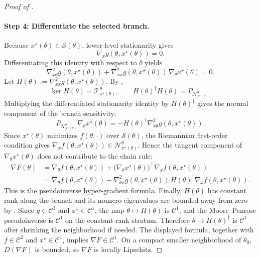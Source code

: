 \documentclass{article}
\theoremstyle{normaltheorem}
\newcommand{\calS}{\mathcal{S}}
\newcommand{\calT}{\mathcal{T}}
\newcommand{\calN}{\mathcal{N}}
\begin{document}
\begin{proof}[Proof of ]
\paragraph{Step 4: Differentiate the selected branch.}
Because \(x^\star(\theta)\in\calS(\theta)\), lower-level stationarity gives
\[
\nabla_x g(\theta,x^\star(\theta))=0.
\]
Differentiating this identity with respect to \(\theta\) yields
\[
\nabla_{x\theta}^{2}g(\theta,x^\star(\theta))
+\nabla_{xx}^{2}g(\theta,x^\star(\theta))\,\nabla_\theta x^\star(\theta)=0.
\]
Let \(H(\theta):=\nabla_{xx}^{2}g(\theta,x^\star(\theta))\). By ,
\[
\ker H(\theta)=\calT_{x^\star(\theta)}^\theta,
\qquad
H(\theta)^\dagger H(\theta)=P_{\calN_{x^\star(\theta)}^\theta}.
\]
Multiplying the differentiated stationarity identity by \(H(\theta)^\dagger\) gives the normal component of the branch
sensitivity:
\[
P_{\calN_{x^\star(\theta)}^\theta}\nabla_\theta x^\star(\theta)
=
-H(\theta)^\dagger\nabla_{x\theta}^{2}g(\theta,x^\star(\theta)).
\]
Since \(x^\star(\theta)\) minimizes \(f(\theta,\cdot)\) over \(\calS(\theta)\), the Riemannian first-order condition gives
\(\nabla_x f(\theta,x^\star(\theta))\in\calN_{x^\star(\theta)}^\theta\). Hence the tangent component of
\(\nabla_\theta x^\star(\theta)\) does not contribute to the chain rule:
\[
\begin{aligned}
\nabla F(\theta)
&=\nabla_\theta f(\theta,x^\star(\theta))
+\big(\nabla_\theta x^\star(\theta)\big)^\top\nabla_x f(\theta,x^\star(\theta))\\
&=\nabla_\theta f(\theta,x^\star(\theta))
-\nabla_{\theta x}^{2}g(\theta,x^\star(\theta))\,
H(\theta)^\dagger\nabla_x f(\theta,x^\star(\theta)).
\end{aligned}
\]
This is the pseudoinverse hyper-gradient formula. Finally, \(H(\theta)\) has constant rank along the branch and its
nonzero eigenvalues are bounded away from zero by . Since \(g\in\mathcal C^3\) and
\(x^\star\in\mathcal C^1\), the map \(\theta\mapsto H(\theta)\) is \(\mathcal C^1\), and the Moore--Penrose
pseudoinverse is \(\mathcal C^1\) on the constant-rank stratum. Therefore \(\theta\mapsto H(\theta)^\dagger\) is
\(\mathcal C^1\) after shrinking the neighborhood if needed. The displayed formula, together with \(f\in\mathcal C^2\)
and \(x^\star\in\mathcal C^1\), implies \(\nabla F\in\mathcal C^1\). On a compact smaller neighborhood of \(\theta_0\),
\(D(\nabla F)\) is bounded, so \(\nabla F\) is locally Lipschitz.
\end{proof}
\end{document}
